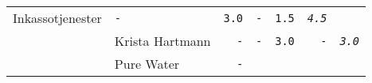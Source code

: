 \documentclass[11pt,A4paper,]{article}
\begin{document}
\begin{longtable}[]{@{}llrrrrr@{}}
\begin{minipage}[t]{0.14\columnwidth}
Inkassotjenester\strut
\end{minipage} & \begin{minipage}[t]{0.14\columnwidth}\raggedleft\strut
\texttt{-}\strut
\end{minipage} & \begin{minipage}[t]{0.14\columnwidth}\raggedleft\strut
\texttt{3.0}\strut
\end{minipage} & \begin{minipage}[t]{0.14\columnwidth}\raggedleft\strut
\texttt{-}\strut
\end{minipage} & \begin{minipage}[t]{0.14\columnwidth}\raggedleft\strut
\texttt{1.5}\strut
\end{minipage} & \begin{minipage}[t]{0.14\columnwidth}\raggedleft\strut
\emph{\texttt{4.5}}\strut
\end{minipage}\tabularnewline
\begin{minipage}[t]{0.14\columnwidth}\raggedright\strut
\strut
\end{minipage} & \begin{minipage}[t]{0.14\columnwidth}\raggedright\strut
Krista Hartmann\strut
\end{minipage} & \begin{minipage}[t]{0.14\columnwidth}\raggedleft\strut
\texttt{-}\strut
\end{minipage} & \begin{minipage}[t]{0.14\columnwidth}\raggedleft\strut
\texttt{-}\strut
\end{minipage} & \begin{minipage}[t]{0.14\columnwidth}\raggedleft\strut
\texttt{3.0}\strut
\end{minipage} & \begin{minipage}[t]{0.14\columnwidth}\raggedleft\strut
\texttt{-}\strut
\end{minipage} & \begin{minipage}[t]{0.14\columnwidth}\raggedleft\strut
\emph{\texttt{3.0}}\strut
\end{minipage}\tabularnewline
\begin{minipage}[t]{0.14\columnwidth}\raggedright\strut
\strut
\end{minipage} & \begin{minipage}[t]{0.14\columnwidth}\raggedright\strut
Pure Water\strut
\end{minipage} & \begin{minipage}[t]{0.14\columnwidth}\raggedleft\strut
\texttt{-}\strut
\end{minipage} & \begin{minipage}[t]{0.14\columnwidth}\raggedleft\strut

\end{minipage}
\end{longtable}
\end{document}
